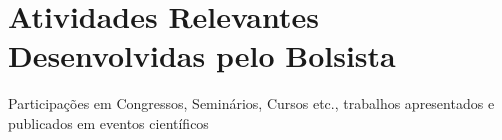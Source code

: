 \section{Atividades Relevantes Desenvolvidas pelo Bolsista}
\label{sec:atividades}

Participações em Congressos, Seminários, Cursos etc., trabalhos apresentados e publicados em eventos científicos
